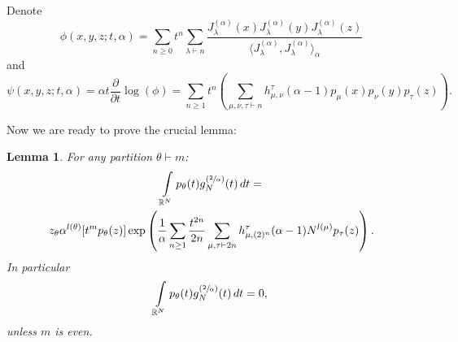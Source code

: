 \documentclass{article}
\newtheorem{lemma}{Lemma}
\newcommand{\J}{J^{(\alpha)}}
\begin{document}
    Denote
    $$
	   \phi(x, y, z; t, \alpha) = \sum\limits_{n \geq 0 }t^n\sum\limits_{\lambda \vdash n}\frac{\J_{\lambda}(x)\J_{\lambda}(y)\J_{\lambda}(z)}{\langle \J_{\lambda}, \J_{\lambda}\rangle_{\alpha}}
    $$
    and
    \begin{equation}\label{eq:psi}  
	   \psi(x, y, z; t, \alpha) = \alpha t\frac{\partial}{\partial t}\log{(\phi)} =
	   \sum\limits_{n\geq 1}t^n
	   \left(\sum\limits_{\mu, \nu, \tau \vdash n}h_{\mu, \nu}^{\tau}(\alpha - 1)p_{\mu}(x)p_{\nu}(y)p_{\tau}(z)\right).
    \end{equation}

Now we are ready to prove the crucial lemma:
\begin{lemma}\label{lemma:moments_and_h}
    For any partition $\theta \vdash m$:
    \begin{multline}
        \int\limits_{\mathbb{R}^N}p_{\theta}(t)g_N^{(\sfrac{2}{\alpha})}(t)\mathop{dt} = \\ z_{\theta}\alpha^{l(\theta)}[t^mp_{\theta}(z)]\exp\left(\frac{1}{\alpha}\sum\limits_{n \geq 1}\frac{t^{2n}}{2n}\sum\limits_{\mu, \tau \vdash 2n}h_{\mu, (2)^n}^{\tau}(\alpha - 1)N^{l(\mu)}p_{\tau}(z)\right).
    \end{multline}
    In particular
    $$
        \int\limits_{\mathbb{R}^N}p_{\theta}(t)g_N^{(\sfrac{2}{\alpha})}(t)\mathop{dt} = 0,
    $$
    unless $m$ is even.
\end{lemma}
\end{document}
